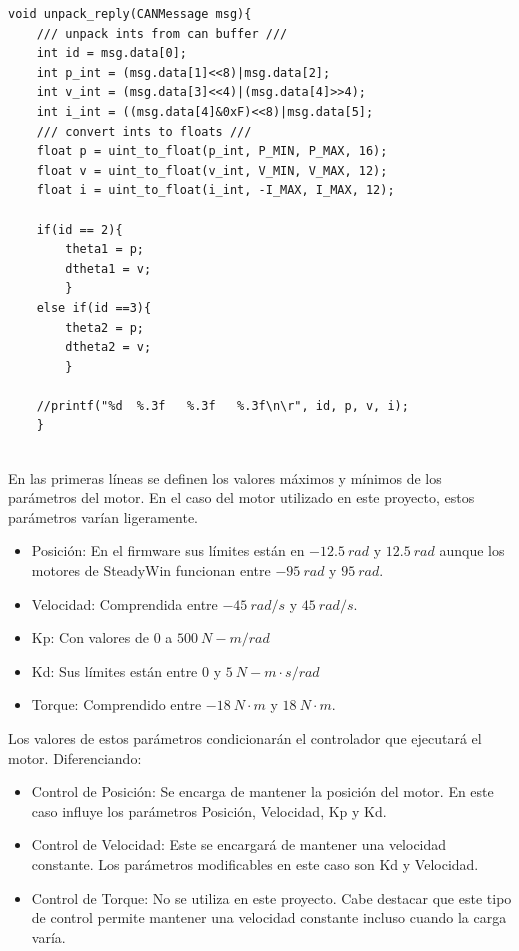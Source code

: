 \begin{lstlisting}[language=Arduino, caption= main.cpp, basicstyle=\scriptsize]
void unpack_reply(CANMessage msg){
    /// unpack ints from can buffer ///
    int id = msg.data[0];
    int p_int = (msg.data[1]<<8)|msg.data[2];
    int v_int = (msg.data[3]<<4)|(msg.data[4]>>4);
    int i_int = ((msg.data[4]&0xF)<<8)|msg.data[5];
    /// convert ints to floats ///
    float p = uint_to_float(p_int, P_MIN, P_MAX, 16);
    float v = uint_to_float(v_int, V_MIN, V_MAX, 12);
    float i = uint_to_float(i_int, -I_MAX, I_MAX, 12);
     
    if(id == 2){
        theta1 = p;
        dtheta1 = v;
        }
    else if(id ==3){
        theta2 = p;
        dtheta2 = v;
        }
    
    //printf("%d  %.3f   %.3f   %.3f\n\r", id, p, v, i);
    } 
     
\end{lstlisting}

En las primeras líneas se definen los valores máximos y mínimos de los parámetros del motor. En el caso del motor utilizado en este proyecto, estos parámetros varían ligeramente.

\begin{itemize}
    \item Posición: En el firmware sus límites están en \(-12.5\ rad\) y \(12.5\ rad\) aunque los motores de SteadyWin funcionan entre \(-95\ rad\) y \(95\ rad\).
    \item Velocidad: Comprendida entre \(-45\ rad/s\) y \(45\ rad/s\).
    \item Kp: Con valores de \(0\) a \(500\ N-m/rad\)
    \item Kd: Sus límites están entre \(0\) y \(5\ N-m\cdot s/rad\)
    \item Torque: Comprendido entre \(-18\ N\cdot m\) y \(18\ N\cdot m\).
\end{itemize}

Los valores de estos parámetros condicionarán el controlador que ejecutará el motor. Diferenciando:

\begin{itemize}
    \item Control de Posición: Se encarga de mantener la posición del motor. En este caso influye los parámetros Posición, Velocidad, Kp y Kd.
    \item Control de Velocidad: Este se encargará de mantener una velocidad constante. Los parámetros modificables en este caso son Kd y Velocidad.
    \item Control de Torque: No se utiliza en este proyecto. Cabe destacar que este tipo de control permite mantener una velocidad constante incluso cuando la carga varía.
\end{itemize}

